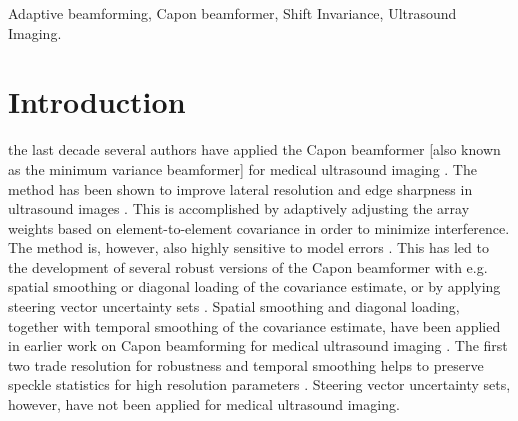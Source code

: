\documentclass[draftcls]{IEEEtran}
\begin{document}
\begin{IEEEkeywords}
Adaptive beamforming, Capon beamformer, Shift Invariance, Ultrasound Imaging.
\end{IEEEkeywords}






%
\IEEEpeerreviewmaketitle



\section{Introduction}
% 
% 
% 
% 

 the last decade several authors have applied the Capon beamformer [also known as the minimum variance beamformer] for medical ultrasound imaging \cite{Synnevag2007, Vignon2008, Viola}. The method has been shown to improve lateral resolution and edge sharpness in ultrasound images \cite{Synnevag2007, Synnevag2009, Chen2011}. This is accomplished by adaptively adjusting the array weights based on element-to-element covariance in order to minimize interference. The method is, however, also highly sensitive to model errors \cite{Mestre2006, Widrow1982, Wax1996, Wax1996a}. This has led to the development of several robust versions of the Capon beamformer with e.g. spatial smoothing \cite{Shan1985} or diagonal loading \cite{JianLi2003} of the covariance estimate, or by applying steering vector uncertainty sets \cite{Lorenz2005, Rubsamen2013}. Spatial smoothing and diagonal loading, together with temporal smoothing of the covariance estimate, have been applied in earlier work on Capon beamforming for medical ultrasound imaging \cite{Synnevag2009}. The first two trade resolution for robustness and temporal smoothing helps to preserve speckle statistics for high resolution parameters \cite{Synnevag2007a}. Steering vector uncertainty sets, however, have not been applied for medical ultrasound imaging.
\end{document}
